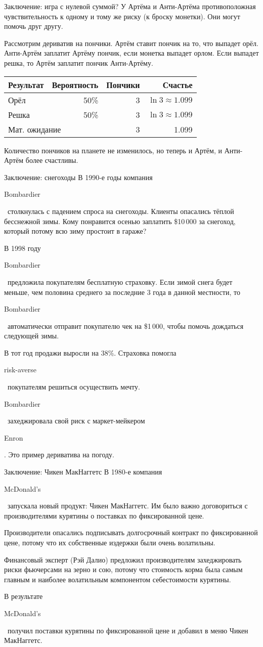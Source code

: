\documentclass{beamer}
\newcommand{\en}[1]{\begin{otherlanguage}{english}#1\end{otherlanguage}}
\begin{document}
\begin{frame}{Заключение: игра с нулевой суммой?}
\justify
У Артёма и Анти-Артёма противоположная чувствительность к одному и тому же риску (к броску монетки). Они могут помочь друг другу.

\justify
Рассмотрим дериватив на пончики. Артём ставит пончик на то, что выпадет орёл. Анти-Артём заплатит Артёму пончик, если монетка выпадет орлом. Если выпадет решка, то Артём заплатит пончик Анти-Артёму.

\justify
\centering
\begin{tabular}{l|r|r|r}
Результат & Вероятность & Пончики & Счастье \\ \hline
Орёл & 50\% & 3 & $\ln 3 \approx 1.099$ \\
Решка & 50\% & 3 & $\ln 3 \approx 1.099$ \\ \hline
\multicolumn{2}{l|}{Мат. ожидание} & 3 & 1.099
\end{tabular}

\justify
Количество пончиков на планете не изменилось, но теперь и Артём, и Анти-Артём более счастливы.
\end{frame}



\begin{frame}{Заключение: снегоходы}
\justify
В 1990-е годы компания \en{Bombardier}\ столкнулась с падением спроса на снегоходы. Клиенты опасались тёплой бесснежной зимы. Кому понравится осенью заплатить \$10\,000 за снегоход, который потому всю зиму простоит в гараже?

\justify
В 1998 году \en{Bombardier}\ предложила покупателям бесплатную страховку. Если зимой снега будет меньше, чем половина среднего за последние 3 года в данной местности, то \en{Bombardier}\ автоматически отправит покупателю чек на \$1\,000, чтобы помочь дождаться следующей зимы.

\justify
В тот год продажи выросли на 38\%. Страховка помогла \en{risk-averse}\ покупателям решиться осуществить мечту.

\justify
\en{Bombardier}\ захеджировала свой риск с маркет-мейкером \en{Enron}. Это пример дериватива на погоду.
\end{frame}




\begin{frame}{Заключение: Чикен МакНаггетс}
\justify
В 1980-е компания \en{McDonald's}\ запускала новый продукт: Чикен МакНаггетс. Им было важно договориться с производителями курятины о поставках по фиксированной цене.

\justify
Производители опасались подписывать долгосрочный контракт по фиксированной цене, потому что их собственные издержки были очень волатильны.

\justify
Финансовый эксперт (Рэй Далио) предложил производителям захеджировать риски фьючерсами на зерно и сою, потому что стоимость корма была самым главным и наиболее волатильным компонентом себестоимости курятины.

\justify
В результате \en{McDonald's}\ получил поставки курятины по фиксированной цене и добавил в меню Чикен МакНаггетс. 
\end{frame}
\end{document}
